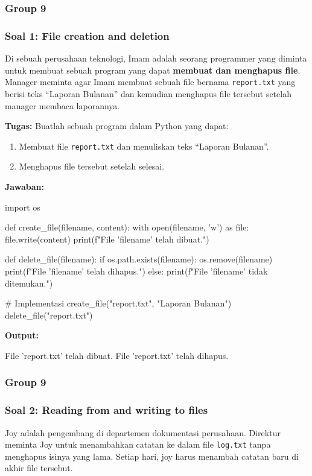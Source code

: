 \documentclass[12pt]{article}
\begin{document}
\subsubsection{Group 9}
\subsubsection*{Soal 1: File creation and deletion}
Di sebuah perusahaan teknologi, Imam adalah seorang programmer yang diminta untuk membuat sebuah program yang dapat \textbf{membuat dan menghapus file}. Manager meminta agar Imam membuat sebuah file bernama \texttt{report.txt} yang berisi teks ``Laporan Bulanan'' dan kemudian menghapus file tersebut setelah manager membaca laporannya.

\textbf{Tugas:} Buatlah sebuah program dalam Python yang dapat:
\begin{enumerate}
    \item Membuat file \texttt{report.txt} dan menuliskan teks ``Laporan Bulanan''.
    \item Menghapus file tersebut setelah selesai.
\end{enumerate}

\textbf{Jawaban:}
\begin{python}
import os

def create_file(filename, content):
    with open(filename, 'w') as file:
        file.write(content)
    print(f"File '{filename}' telah dibuat.")

def delete_file(filename):
    if os.path.exists(filename):
        os.remove(filename)
        print(f"File '{filename}' telah dihapus.")
    else:
        print(f"File '{filename}' tidak ditemukan.")

# Implementasi
create_file("report.txt", "Laporan Bulanan")
delete_file("report.txt")
\end{python}

\textbf{Output:}
\begin{python}
File 'report.txt' telah dibuat.
File 'report.txt' telah dihapus.
\end{python}

\subsubsection{Group 9}
\subsubsection*{Soal 2: Reading from and writing to files}
Joy adalah pengembang di departemen dokumentasi perusahaan. Direktur meminta Joy untuk menambahkan catatan ke dalam file \texttt{log.txt} tanpa menghapus isinya yang lama. Setiap hari, joy harus menambah catatan baru di akhir file tersebut.
\end{document}
